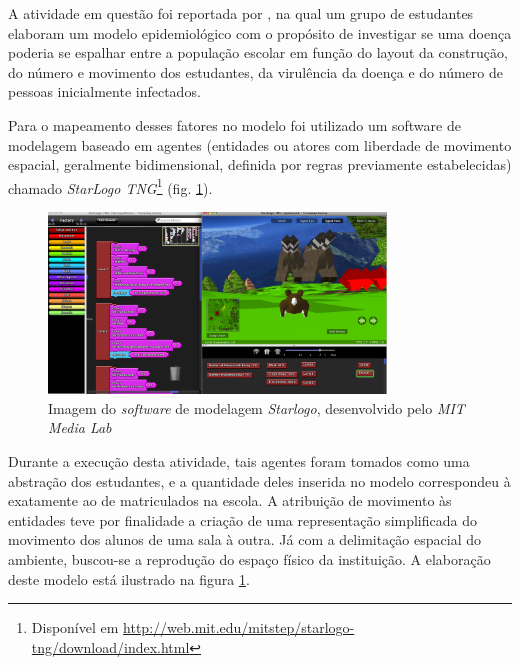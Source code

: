 A atividade em questão foi reportada por , na qual um grupo de estudantes elaboram um modelo epidemiológico com o propósito de investigar se uma doença poderia se espalhar entre a população escolar em função do layout da construção, do número e movimento dos estudantes, da virulência da doença e do número de pessoas inicialmente infectados.
 
Para o mapeamento desses fatores no modelo foi utilizado um software de modelagem baseado em agentes (entidades ou atores com liberdade de movimento espacial, geralmente bidimensional, definida por regras previamente estabelecidas) chamado \textit{StarLogo TNG}\footnote{Disponível em \href{http://web.mit.edu/mitstep/starlogo-tng/download/index.html}{http://web.mit.edu/mitstep/starlogo-tng/download/index.html}} (fig. \ref{fig:starlogo}).

\begin{figure}[!htb]
  \caption{Imagem do \textit{software} de modelagem \textit{Starlogo}, desenvolvido pelo \textit{MIT Media Lab}}
  \begin{center}
    \includegraphics[width=0.8\textwidth]{imagens/starlogo}
  \end{center}
  \label{fig:starlogo}
\end{figure}

Durante a execução desta atividade, tais agentes foram tomados como uma abstração dos estudantes, e a quantidade deles inserida no modelo correspondeu à exatamente ao de matriculados na escola. A atribuição de movimento às entidades teve por finalidade a criação de uma representação simplificada do movimento dos alunos de uma sala à outra. Já com a delimitação espacial do ambiente, buscou-se a reprodução do espaço físico da instituição. A elaboração deste modelo está ilustrado na figura \ref{fig:starlogo}.

